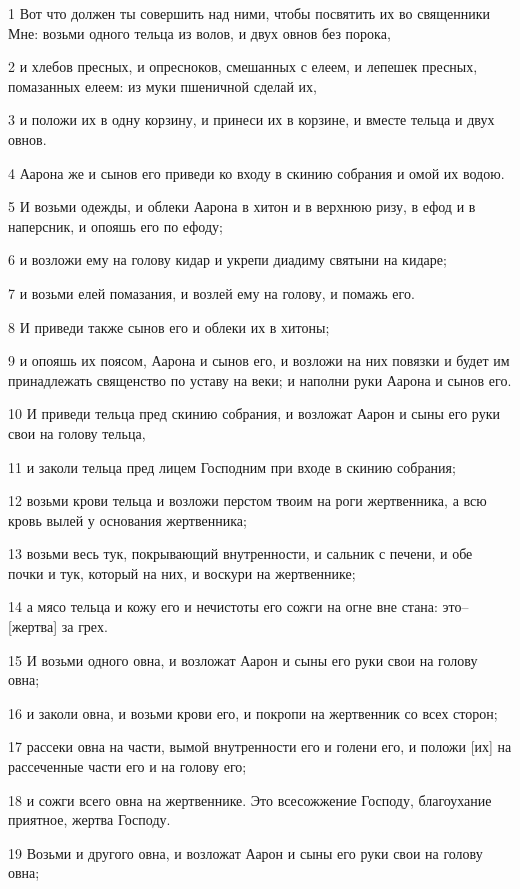 \par 1 Вот что должен ты совершить над ними, чтобы посвятить их во священники Мне: возьми одного тельца из волов, и двух овнов без порока,
\par 2 и хлебов пресных, и опресноков, смешанных с елеем, и лепешек пресных, помазанных елеем: из муки пшеничной сделай их,
\par 3 и положи их в одну корзину, и принеси их в корзине, и вместе тельца и двух овнов.
\par 4 Аарона же и сынов его приведи ко входу в скинию собрания и омой их водою.
\par 5 И возьми одежды, и облеки Аарона в хитон и в верхнюю ризу, в ефод и в наперсник, и опояшь его по ефоду;
\par 6 и возложи ему на голову кидар и укрепи диадиму святыни на кидаре;
\par 7 и возьми елей помазания, и возлей ему на голову, и помажь его.
\par 8 И приведи также сынов его и облеки их в хитоны;
\par 9 и опояшь их поясом, Аарона и сынов его, и возложи на них повязки и будет им принадлежать священство по уставу на веки; и наполни руки Аарона и сынов его.
\par 10 И приведи тельца пред скинию собрания, и возложат Аарон и сыны его руки свои на голову тельца,
\par 11 и заколи тельца пред лицем Господним при входе в скинию собрания;
\par 12 возьми крови тельца и возложи перстом твоим на роги жертвенника, а всю кровь вылей у основания жертвенника;
\par 13 возьми весь тук, покрывающий внутренности, и сальник с печени, и обе почки и тук, который на них, и воскури на жертвеннике;
\par 14 а мясо тельца и кожу его и нечистоты его сожги на огне вне стана: это--[жертва] за грех.
\par 15 И возьми одного овна, и возложат Аарон и сыны его руки свои на голову овна;
\par 16 и заколи овна, и возьми крови его, и покропи на жертвенник со всех сторон;
\par 17 рассеки овна на части, вымой внутренности его и голени его, и положи [их] на рассеченные части его и на голову его;
\par 18 и сожги всего овна на жертвеннике. Это всесожжение Господу, благоухание приятное, жертва Господу.
\par 19 Возьми и другого овна, и возложат Аарон и сыны его руки свои на голову овна;

